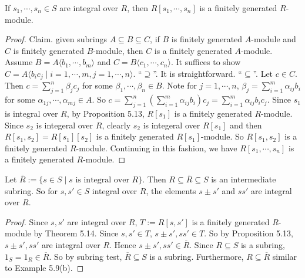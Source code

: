 \begin{theorem}
    If $s_1,\cdots,s_n \in S$ are integral over $R$, then $R[s_1,\cdots,s_n]$ is a finitely generated $R$-module. 
\end{theorem}

\begin{proof}
    Claim. given subrings $A \subseteq B \subseteq C$, if $B$ is finitely generated $A$-module and $C$ is finitely generated $B$-module, then $C$ is a finitely generated $A$-module. Assume $B = A\langle b_1,\cdots,b_m \rangle$ and $C = B\langle c_1,\cdots,c_n \rangle$. It suffices to show $C = A \langle b_ic_j \mid i = 1,\cdots,m, j = 1,\cdots,n\rangle$. ``$\supseteq$''. It is straightforward. ``$\subseteq$''. Let $c \in C$. Then $c = \sum_{j=1}^{n} \beta_jc_j$ for some $\beta_1,\cdots,\beta_n \in B$. Note for $j = 1,\cdots,n$, $\beta_j = \sum_{i=1}^{m} \alpha_{ij}b_i$ for some $\alpha_{1j},\cdots,\alpha_{mj} \in A$. So $c = \sum_{j=1}^{n}(\sum_{i=1}^{m}\alpha_{ij}b_i)c_j = \sum_{i=1}^{m} \alpha_{ij}b_ic_j$. Since $s_1$ is integral over $R$, by Proposition 5.13, $R[s_1]$ is a finitely generated $R$-module. Since $s_2$ is integeral over $R$, clearly $s_2$ is integeral over $R[s_1]$ and then $R[s_1,s_2] = R[s_1][s_2]$ is a finitely generated $R[s_1]$-module. So $R[s_1,s_2]$ is a finitely generated $R$-module. Continuing in this fashion, we have $R[s_1,\cdots,s_n]$ is a finitely generated $R$-module.
\end{proof}

\begin{theorem}
    Let $\overbar{R} := \{s \in S \mid s \text{ is integral over }R\}$. Then $R \subseteq \overbar{R} \subseteq S$ is an intermediate subring. So for $s,s' \in S$ integral over $R$, the elements $s \pm s'$ and $ss'$ are integral over $R$.
\end{theorem}

\begin{proof}
    Since $s,s'$ are integral over $R$, $T := R[s,s']$ is a finitely generated $R$-module by Theorem 5.14. Since $s, s' \in T$, $s \pm s',ss' \in T$. So by Proposition 5.13, $s \pm s',ss'$ are integral over $R$. Hence $s \pm s', ss' \in \overbar{R}$. Since $R \subseteq S$ is a subring, $1_S = 1_R \in \overbar{R}$. So by subring test, $\overbar{R} \subseteq S$ is a subring. Furthermore, $R \subseteq \overbar{R}$ similar to Example 5.9(b). 
\end{proof}


